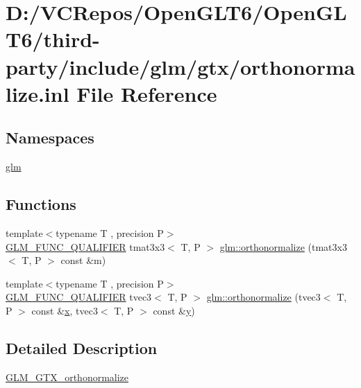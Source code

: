 \hypertarget{orthonormalize_8inl}{}\section{D\+:/\+V\+C\+Repos/\+Open\+G\+L\+T6/\+Open\+G\+L\+T6/third-\/party/include/glm/gtx/orthonormalize.inl File Reference}
\label{orthonormalize_8inl}
\subsection*{Namespaces}
\begin{DoxyCompactItemize}
\item 
 \mbox{\hyperlink{namespaceglm}{glm}}
\end{DoxyCompactItemize}
\subsection*{Functions}
\begin{DoxyCompactItemize}
\item 
{\footnotesize template$<$typename T , precision P$>$ }\\\mbox{\hyperlink{setup_8hpp_a33fdea6f91c5f834105f7415e2a64407}{G\+L\+M\+\_\+\+F\+U\+N\+C\+\_\+\+Q\+U\+A\+L\+I\+F\+I\+ER}} tmat3x3$<$ T, P $>$ \mbox{\hyperlink{group__gtx__orthonormalize_ga23c4340b8f1559d259229b6d8bdc3f97}{glm\+::orthonormalize}} (tmat3x3$<$ T, P $>$ const \&m)
\item 
{\footnotesize template$<$typename T , precision P$>$ }\\\mbox{\hyperlink{setup_8hpp_a33fdea6f91c5f834105f7415e2a64407}{G\+L\+M\+\_\+\+F\+U\+N\+C\+\_\+\+Q\+U\+A\+L\+I\+F\+I\+ER}} tvec3$<$ T, P $>$ \mbox{\hyperlink{group__gtx__orthonormalize_gad7afff30d7323fdc7aed7f5a16a0c596}{glm\+::orthonormalize}} (tvec3$<$ T, P $>$ const \&\mbox{\hyperlink{glad_8h_a92d0386e5c19fb81ea88c9f99644ab1d}{x}}, tvec3$<$ T, P $>$ const \&\mbox{\hyperlink{glad_8h_a66ddd433d2cacfe27f5906b7e86faeed}{y}})
\end{DoxyCompactItemize}


\subsection{Detailed Description}
\mbox{\hyperlink{group__gtx__orthonormalize}{G\+L\+M\+\_\+\+G\+T\+X\+\_\+orthonormalize}} 
